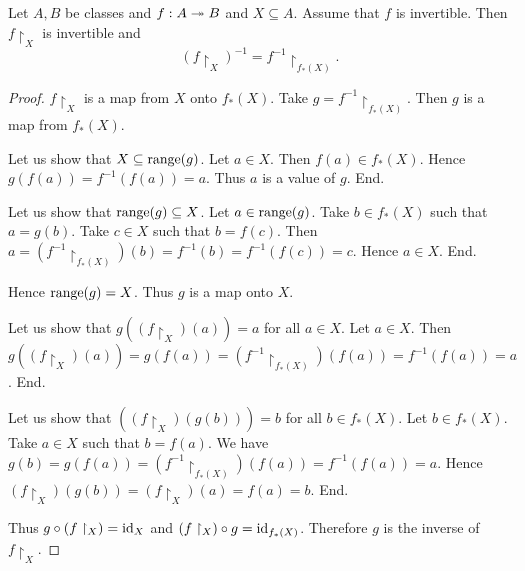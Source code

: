 \documentclass[../set-theory.tex]{subfiles}
\begin{document}
  \begin{forthel}
    \begin{proposition}
      Let $A, B$ be classes and $f : A \twoheadrightarrow B$ and $X \subseteq A$.
      Assume that $f$ is invertible.
      Then $f \restriction_{X}$ is invertible and
      \[ (f\restriction_{X})^{-1} = f^{-1} \restriction_{f_{*}(X)}. \]
    \end{proposition}
    \begin{proof}
      $f \restriction_{X}$ is a map from $X$ onto $f_{*}(X)$.
      Take $g = f^{-1} \restriction_{f_{*}(X)}$.
      Then $g$ is a map from $f_{*}(X)$.

      Let us show that $X \subseteq \operatorname{range}(g)$.
        Let $a \in X$.
        Then $f(a) \in f_{*}(X)$.
        Hence $g(f(a)) = f^{-1}(f(a)) = a$.
        Thus $a$ is a value of $g$.
      End.

      Let us show that $\operatorname{range}(g) \subseteq X$.
        Let $a \in \operatorname{range}(g)$.
        Take $b \in f_{*}(X)$ such that $a = g(b)$.
        Take $c \in X$ such that $b = f(c)$.
        Then $a = (f^{-1} \restriction_{f_{*}(X)})(b) = f^{-1}(b) = f^{-1}(f(c)) = c$.
        Hence $a \in X$.
      End.

      Hence $\operatorname{range}(g) = X$.
      Thus $g$ is a map onto $X$.

      Let us show that $g((f \restriction_{X})(a)) = a$ for all $a \in X$.
        Let $a \in X$.
        Then $g((f \restriction_{X})(a)) = g(f(a)) = (f^{-1} \restriction_{f_{*}(X)})(f(a)) = f^{-1}(f(a)) = a$.
      End.

      Let us show that $((f \restriction_{X})(g(b))) = b$ for all $b \in f_{*}(X)$.
        Let $b \in f_{*}(X)$.
        Take $a \in X$ such that $b = f(a)$.
        We have $g(b) = g(f(a)) = (f^{-1} \restriction_{f_{*}(X)})(f(a)) = f^{-1}(f(a)) = a$.
        Hence $(f \restriction_{X})(g(b)) = (f \restriction_{X})(a) = f(a) = b$.
      End.

      Thus $g \circ (f \restriction_{X}) = \operatorname{id}_{X}$ and $(f \restriction_{X}) \circ g = \operatorname{id}_{f_{*}(X)}$.
      Therefore $g$ is the inverse of $f \restriction_{X}$.
    \end{proof}
  \end{forthel}
\end{document}
